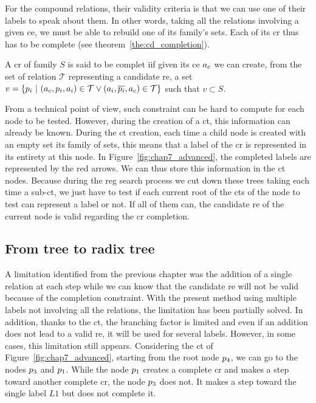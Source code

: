 For the compound relations, their validity criteria is that we can use one of their labels to speak about them. In other words, taking all the relations involving a given \acrshort{ce}, we must be able to rebuild one of its family's sets. Each of its \acrshort{cr} thus has to be complete (see theorem~\ref{the:cd_completion}).

\begin{theorem} 
\label{the:cd_completion}
A \acrshort{cr} of family $S$ is said to be complet iif given its \acrshort{ce} $a_c$ we can create, from the set of relation $\mathcal{T}$ representing a candidate \acrshort{re}, a set $v = \{p_i\ |\ (a_c, p_i, a_i) \in \mathcal{T} \lor (a_i, \overline{p_i}, a_c) \in \mathcal{T} \}$ such that $v \subset S$.
\end{theorem}

From a technical point of view, such constraint can be hard to compute for each node to be tested. However, during the creation of a \acrshort{ct}, this information can already be known. During the \acrshort{ct} creation, each time a child node is created with an empty set its family of sets, this means that a label of the \acrshort{cr} is represented in its entirety at this node. In Figure~\ref{fig:chap7_advanced}, the completed labels are represented by the red arrows. We can thus store this information in the \acrshort{ct} nodes. Because during the \acrshort{reg} search process we cut down these trees taking each time a sub-\acrshort{ct}, we just have to test if each current root of the \acrshort{ct}s of the node to test can represent a label or not. If all of them can, the candidate \acrshort{re} of the current node is valid regarding the \acrshort{cr} completion.

\subsection{From tree to radix tree}

A limitation identified from the previous chapter was the addition of a single relation at each step while we can know that the candidate \acrshort{re} will not be valid because of the completion constraint. With the present method using multiple labels not involving all the relations, the limitation has been partially solved. In addition, thanks to the \acrshort{ct}, the branching factor is limited and even if an addition does not lead to a valid \acrshort{re}, it will be used for several labels. However, in some cases, this limitation still appears. Considering the \acrlong{ct} of Figure~\ref{fig:chap7_advanced}, starting from the root node $p_4$, we can go to the nodes $p_3$ and $p_1$. While the node $p_1$ creates a complete \acrshort{cr} and makes a step toward another complete \acrshort{cr}, the node $p_3$ does not. It makes a step toward the single label $L1$ but does not complete it.

